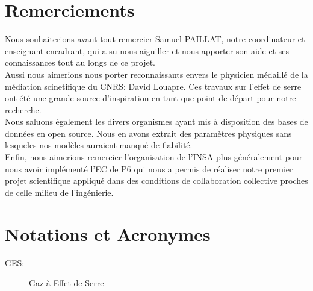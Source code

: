 \documentclass[a4paper, 12pt]{report} %
\begin{document}

\newpage
\chapter*{Remerciements} %

\setlength{\parindent}{30pt}
Nous souhaiterions avant tout remercier Samuel PAILLAT, notre
coordinateur et enseignant encadrant, qui a su nous aiguiller
et nous apporter son aide et ses connaissances tout au longs
de ce projet. \\

\indent Aussi nous aimerions nous porter reconnaissants 
envers le physicien médaillé de la médiation scinetifique
du CNRS: David Louapre. Ces travaux sur l'effet de serre 
ont été une grande source d'inspiration en tant que point 
de départ pour notre recherche. \\

\indent Nous saluons également les divers organismes ayant 
mis à disposition des bases de données en open source. Nous
en avons extrait des paramètres physiques sans lesqueles 
nos modèles auraient manqué de fiabilité. \\

\indent Enfin, nous aimerions remercier l'organisation de 
l'INSA plus généralement pour nous avoir implémenté l'EC de P6
qui nous a permis de réaliser notre premier projet
scientifique appliqué dans des conditions de collaboration
collective proches de celle milieu de l'ingénierie. 
\vfill



\newpage
\pagestyle{courant} 
	\setcounter{tocdepth}{2} %
	\tableofcontents %


\newpage
\chapter*{Notations et Acronymes} 

\begin{description}
	\item[GES:] Gaz à Effet de Serre
\end{description}
\end{document}
